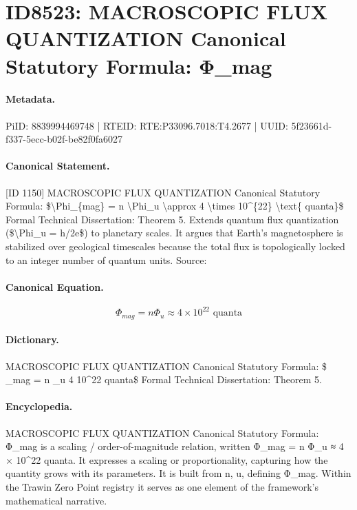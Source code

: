 \section*{ID8523: MACROSCOPIC FLUX QUANTIZATION Canonical Statutory Formula: Φ\_mag}
\paragraph{Metadata.}
PiID: 8839994469748 | RTEID: RTE:P33096.7018:T4.2677 | UUID: 5f23661d-f337-5ecc-b02f-be82f0fa6027

\paragraph{Canonical Statement.}
[ID 1150] MACROSCOPIC FLUX QUANTIZATION Canonical Statutory Formula: \$\textbackslash{}Phi\_\{mag\} = n \textbackslash{}Phi\_u \textbackslash{}approx 4 \textbackslash{}times 10\textasciicircum{}\{22\} \textbackslash{}text\{ quanta\}\$ Formal Technical Dissertation: Theorem 5. Extends quantum flux quantization (\$\textbackslash{}Phi\_u = h/2e\$) to planetary scales. It argues that Earth's magnetosphere is stabilized over geological timescales because the total flux is topologically locked to an integer number of quantum units. Source:

\paragraph{Canonical Equation.}
\[
\Phi_{mag} = n \Phi_u \approx 4 \times 10^{22} \text{ quanta}
\]

\paragraph{Dictionary.}
MACROSCOPIC FLUX QUANTIZATION Canonical Statutory Formula: \$ \_mag = n \_u 4 10\textasciicircum{}22 quanta\$ Formal Technical Dissertation: Theorem 5.

\paragraph{Encyclopedia.}
MACROSCOPIC FLUX QUANTIZATION Canonical Statutory Formula: Φ\_mag is a scaling / order-of-magnitude relation, written Φ\_mag = n Φ\_u ≈ 4 × 10\textasciicircum{}22 quanta. It expresses a scaling or proportionality, capturing how the quantity grows with its parameters. It is built from n, u, defining Φ\_mag. Within the Trawin Zero Point registry it serves as one element of the framework's mathematical narrative.
